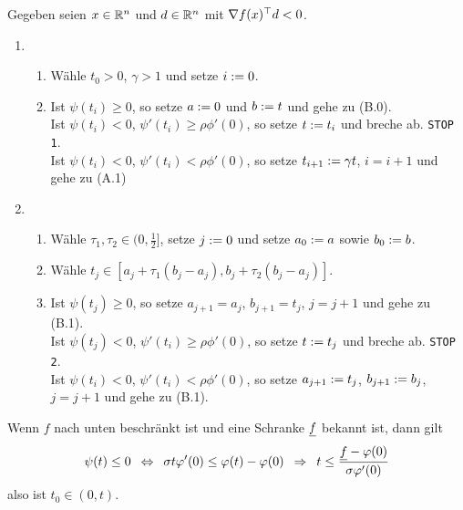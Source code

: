 \begin{algorithmus} \label{alg}
	Gegeben seien $x \in \mathbb{R}^n$ und $d \in \mathbb{R}^n$ mit $\nabla f(x)^{\top} d < 0$. 
	\begin{enumerate}[label=Phase~\Alph*., leftmargin=4.5em, nolistsep]
		\item ~
		\begin{enumerate}[label=\Alph{enumi}.\arabic*, start=0]
			\item Wähle $t_0 > 0$, $\gamma > 1$ und setze $i \mathrel{:=} 0$.
			\item Ist $\psi(t_i) \ge 0$, so setze $a \mathrel{:=} 0$ und $b \mathrel{:=} t$ und gehe zu (B.0). \\
			Ist $\psi(t_i) < 0$, $\psi'(t_i) \ge \rho \phi'(0)$, so setze $t \mathrel{:=} t_i$ und breche ab. \texttt{STOP 1}. \\
			Ist $\psi(t_i) < 0$, $\psi'(t_i) < \rho \phi'(0)$, so setze $t_{i+1} \mathrel{:=} \gamma t$, $i = i+1$ und gehe zu (A.1)
		\end{enumerate}
		\item ~
		\begin{enumerate}[label=\Alph{enumi}.\arabic*, start=0, nolistsep]
			\item Wähle $\tau_1, \tau_2 \in (0,\frac{1}{2}]$, setze $j \mathrel{:=} 0$ und setze $a_0 \mathrel{:=} a$ sowie $b_0 \mathrel{:=} b$.
			\item Wähle $t_j \in [a_j + \tau_1 (b_j - a_j), b_j + \tau_2 (b_j - a_j)]$.
			\item Ist $\psi(t_j) \ge 0$, so setze $a_{j+1} = a_j$, $b_{j+1} = t_j$, $j=j+1$ und gehe zu (B.1). \\
			Ist $\psi(t_j) < 0$, $\psi'(t_i) \ge \rho \phi'(0)$, so setze $t \mathrel{:=} t_j$ und breche ab. \texttt{STOP 2}. \\
			Ist $\psi(t_i) < 0$, $\psi'(t_i) < \rho \phi'(0)$, so setze $a_{j+1} \mathrel{:=} t_j$, $b_{j+1} \mathrel{:=} b_j$, $j = j+1$ und gehe zu (B.1).
		\end{enumerate}
	\end{enumerate}
\end{algorithmus}

Wenn $f$ nach unten beschränkt ist und eine Schranke $\uline{f}$ bekannt ist, dann gilt
\begin{align*}
	\psi(t) \le 0 \equivalent \sigma t \phi'(0) \le \phi(t) - \phi(0) \follows t \le \frac{\uline{f} - \phi(0)}{\sigma \phi'(0)}
\end{align*}
also ist $t_0 \in (0,t)$.

